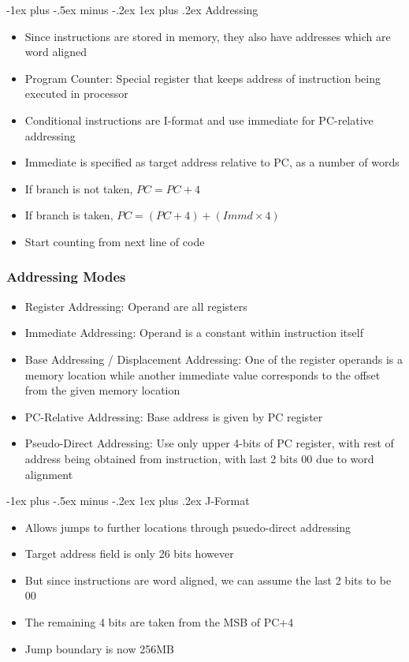 \documentclass[10pt, portrait]{article}
\makeatletter
\renewcommand{\subsection}{\@startsection{subsection}{3}{0mm}%
                                {-1ex plus -.5ex minus -.2ex}%
                                {1ex plus .2ex}%
                                {\normalfont\small\bfseries}}%
\makeatother
\begin{document}
\begin{multicols*}{2}
\subsection{Addressing}
\begin{itemize}
    \item Since instructions are stored in memory, they also have addresses which are word aligned
    \item Program Counter: Special register that keeps address of instruction being executed in processor
    \item Conditional instructions are I-format and use immediate for PC-relative addressing
    \item Immediate is specified as target address relative to PC, as a number of words
    \item If branch is not taken, $PC = PC + 4$
    \item If branch is taken, $PC = (PC+4)+(Immd \times 4)$
    \item Start counting from next line of code
\end{itemize}

\subsubsection{Addressing Modes}
\begin{itemize}
    \item Register Addressing: Operand are all registers
    \item Immediate Addressing: Operand is a constant within instruction itself
    \item Base Addressing / Displacement Addressing: One of the register operands is a memory location while another immediate value corresponds to the offset from the given memory location
    \item PC-Relative Addressing: Base address is given by PC register
    \item Pseudo-Direct Addressing: Use only upper 4-bits of PC register, with rest of address being obtained from instruction, with last 2 bits 00 due to word alignment
\end{itemize}

\subsection{J-Format}
\begin{itemize}
    \item Allows jumps to further locations through psuedo-direct addressing
    \item Target address field is only 26 bits however
    \item But since instructions are word aligned, we can assume the last 2 bits to be 00
    \item The remaining 4 bits are taken from the MSB of PC+4
    \item Jump boundary is now 256MB
\end{itemize}


\end{multicols*}
\end{document}
